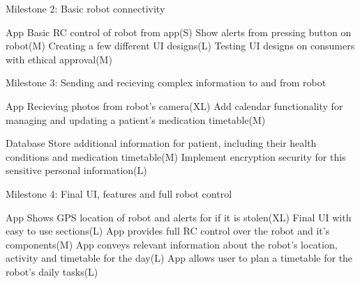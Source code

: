 \documentclass{article}
\begin{document}
Milestone 2: Basic robot connectivity

App
    Basic RC control of robot from app(S)
    Show alerts from pressing button on robot(M)
    Creating a few different UI designs(L)
    Testing UI designs on consumers with ethical approval(M)
    
Milestone 3: Sending and recieving complex information to and from robot

App
    Recieving photos from robot's camera(XL)
    Add calendar functionality for managing and updating a patient's medication timetable(M)

Database
    Store additional information for patient, including their health conditions and medication timetable(M)
    Implement encryption security for this sensitive personal information(L)

Milestone 4: Final UI, features and full robot control

App
    Shows GPS location of robot and alerts for if it is stolen(XL)
    Final UI with easy to use sections(L)
    App provides full RC control over the robot and it's components(M)
    App conveys relevant information about the robot's location, activity and timetable for the day(L)
    App allows user to plan a timetable for the robot's daily tasks(L)
   
    




\end{document}
